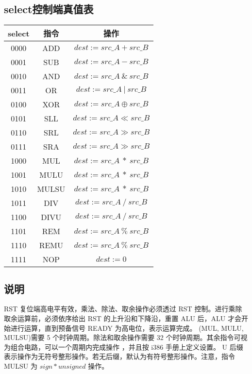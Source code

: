 \subsection{select控制端真值表}
\begin{tabular}{|c|c|c|}
    \hline
    select      &   指令   &      操作\\\hline
    0000        &   ADD     &    ${dest := src\_A + src\_B}$\\\hline
    0001        &   SUB     &    ${dest := src\_A - src\_B}$\\\hline
    0010        &   AND     &    ${dest := src\_A\ \&\ src\_B}$\\\hline
    0011        &   OR     &     ${dest := src\_A\ |\ src\_B}$\\\hline
    0100        &   XOR     &    ${dest := src\_A \oplus src\_B}$\\\hline
    0101        &   SLL     &    ${dest := src\_A \ll src\_B}$\\\hline
    0110        &   SRL     &    ${dest := src\_A \gg src\_B}$\\\hline
    0111        &   SRA     &    ${dest := src\_A \gg src\_B}$\\\hline
    1000        &   MUL     &    ${dest := src\_A\ *\ src\_B}$\\\hline
    1001        &   MULU    &    ${dest := src\_A\ *\ src\_B}$\\\hline
    1010        &   MULSU   &    ${dest := src\_A\ *\ src\_B}$\\\hline
    1011        &   DIV     &    ${dest := src\_A\ /\ src\_B}$\\\hline
    1100        &   DIVU     &   ${dest := src\_A\ /\ src\_B}$\\\hline
    1101        &   REM     &    ${dest := src\_A\ \%\ src\_B}$\\\hline
    1110        &   REMU     &   ${dest := src\_A\ \%\ src\_B}$\\\hline
    1111        &   NOP     &    ${dest := 0}$\\\hline
\end{tabular}
\subsection{说明}
RST 复位端高电平有效，乘法、除法、取余操作必须透过 RST 控制。进行乘除取余运算前，必须依序给出 RST 的上升沿和下降沿，重置 ALU 后，ALU 才会开始进行运算，直到预备信号 READY 为高电位，表示运算完成。
(MUL, MULU, MULSU)需要 5 个时钟周期。除法和取余操作需要 32 个时钟周期。其余指令可视为组合电路，可以一个周期内完成操作
，并且按 i386 手册上定义设置。
 U 后缀表示操作为无符号整形操作。若无后缀，默认为有符号整形操作。注意，指令 MULSU 为 ${sign * unsigned}$ 操作。


